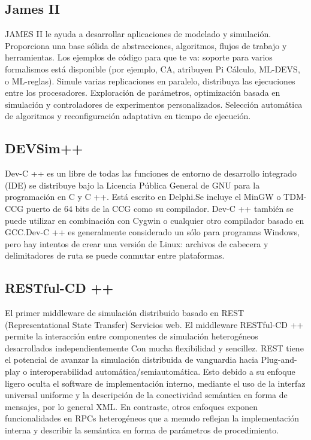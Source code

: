 \subsection{James II}
JAMES II le ayuda a desarrollar aplicaciones de modelado y simulación. Proporciona una base sólida de abstracciones, algoritmos, flujos de trabajo y herramientas. Los ejemplos de código para que te va: soporte para varios formalismos está disponible (por ejemplo, CA, atribuyen Pi Cálculo, ML-DEVS, o ML-reglas).
Simule varias replicaciones en paralelo, distribuya las ejecuciones entre los procesadores. Exploración de parámetros, optimización basada en simulación y controladores de experimentos personalizados. Selección automática de algoritmos y reconfiguración adaptativa en tiempo de ejecución.

\subsection{DEVSim++}
Dev-C ++ es un libre de todas las funciones de entorno de desarrollo integrado (IDE) se distribuye bajo la Licencia Pública General de GNU para la programación en C y C ++. Está escrito en Delphi.Se incluye el MinGW o TDM-CCG puerto de 64 bits de la CCG como su compilador. Dev-C ++ también se puede utilizar en combinación con Cygwin o cualquier otro compilador basado en GCC.Dev-C ++ es generalmente considerado un sólo para programas Windows, pero hay intentos de crear una versión de Linux: archivos de cabecera y delimitadores de ruta se puede conmutar entre plataformas.

\subsection{RESTful-CD ++}
El primer middleware de simulación distribuido basado en REST (Representational State Transfer) Servicios web. El middleware RESTful-CD ++ permite la interacción entre componentes de simulación heterogéneos desarrollados independientemente Con mucha flexibilidad y sencillez. REST tiene el potencial de avanzar la simulación distribuida de vanguardia hacia
Plug-and-play o interoperabilidad automática/semiautomática. Esto debido a su enfoque ligero oculta el software de implementación interno, mediante el uso de la interfaz universal uniforme y la descripción de la conectividad semántica en forma de mensajes, por lo general XML. En contraste, otros enfoques exponen funcionalidades en RPCs heterogéneos que a menudo reflejan la implementación interna y describir la semántica en forma de parámetros de procedimiento. 

